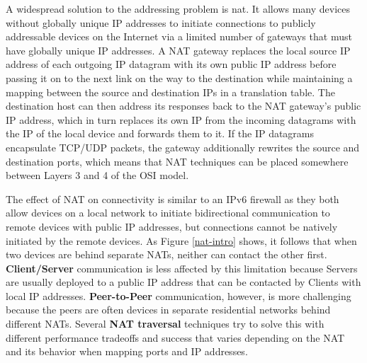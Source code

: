 A widespread solution to the addressing problem is \gls{nat}. It allows
many devices without globally unique IP addresses to initiate
connections to publicly addressable devices on the Internet via a
limited number of gateways that must have globally unique IP addresses.
A NAT gateway replaces the local source IP address of each outgoing IP
datagram with its own public IP address before passing it on to the next
link on the way to the destination while maintaining a mapping between
the source and destination IPs in a translation table. The destination
host can then address its responses back to the NAT gateway's public IP
address, which in turn replaces its own IP from the incoming datagrams
with the IP of the local device and forwards them to it. If the IP
datagrams encapsulate TCP/UDP packets, the gateway additionally rewrites
the source and destination ports, which means that NAT techniques can be
placed somewhere between Layers 3 and 4 of the OSI model.

The effect of NAT on connectivity is similar to an IPv6 firewall as they
both allow devices on a local network to initiate bidirectional
communication to remote devices with public IP addresses, but
connections cannot be natively initiated by the remote devices. As
Figure \ref{nat-intro} shows, it follows that when two devices are
behind separate NATs, neither can contact the other first.
\textbf{Client/Server} communication is less affected by this limitation
because Servers are usually deployed to a public IP address that can be
contacted by Clients with local IP addresses. \textbf{Peer-to-Peer}
communication, however, is more challenging because the peers are often
devices in separate residential networks behind different NATs. Several
\textbf{NAT traversal} techniques try to solve this with different
performance tradeoffs and success that varies depending on the NAT
\autocite{natBehaviorRFC} and its behavior when mapping ports and IP
addresses.

